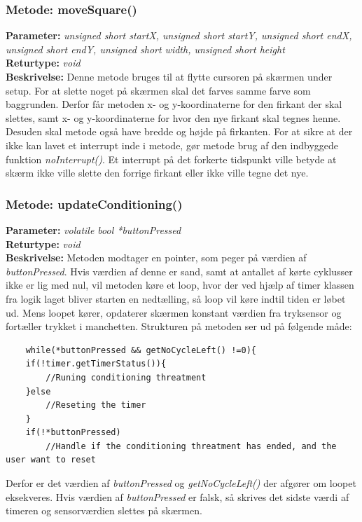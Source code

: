 \subsubsection{Metode: moveSquare()}
\textbf{Parameter: } \textit{unsigned short startX, unsigned short startY, unsigned short endX, unsigned short endY, unsigned short width, unsigned short height}
\\ \textbf{Returtype: } \textit{void}
\\ \textbf{Beskrivelse: } Denne metode bruges til at flytte cursoren på skærmen under setup. For at slette noget på skærmen skal det farves samme farve som baggrunden. Derfor får metoden  x- og y-koordinaterne for den firkant der skal slettes, samt x- og y-koordinaterne for hvor den nye firkant skal tegnes henne. Desuden skal metode også have bredde og højde på firkanten. For at sikre at der ikke kan lavet et interrupt inde i metode, gør metode brug af den indbyggede funktion \textit{noInterrupt()}. Et interrupt på det forkerte tidspunkt ville betyde at skærm ikke ville slette den forrige firkant eller ikke ville tegne det nye. 

\subsubsection{Metode: updateConditioning()}
\textbf{Parameter: } \textit{volatile bool *buttonPressed}
\\ \textbf{Returtype: } \textit{void}
\\ \textbf{Beskrivelse: } Metoden modtager en pointer, som peger på værdien af \textit{buttonPressed}. Hvis værdien af denne er sand, samt at antallet af kørte cyklusser ikke er lig med nul, vil metoden køre et loop, hvor der ved hjælp af timer klassen fra logik laget bliver starten en nedtælling, så loop vil køre indtil tiden er løbet ud. Mens loopet kører, opdaterer skærmen konstant værdien fra tryksensor og fortæller trykket i manchetten.  Strukturen på metoden ser ud på følgende måde: 
\begin{lstlisting}
	while(*buttonPressed && getNoCycleLeft() !=0){
	if(!timer.getTimerStatus()){
		//Runing conditioning threatment 
	}else
		//Reseting the timer
	}
	if(!*buttonPressed)
		//Handle if the conditioning threatment has ended, and the user want to reset
\end{lstlisting}
Derfor er det værdien af \textit{buttonPressed} og \textit{getNoCycleLeft()} der afgører om loopet eksekveres. Hvis værdien af \textit{buttonPressed} er falsk, så skrives det sidste værdi af timeren og sensorværdien slettes på skærmen.  \\

